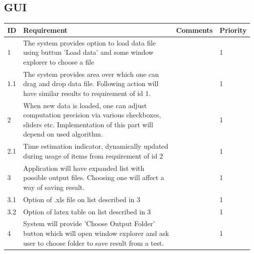\documentclass{article}
\begin{document}


\subsection{GUI} \label{GUI_func_req}

\begin{center}
\hspace*{-2.1cm}
	\begin{longtable}{| l | p{4cm} | p{3.5cm} | l |}
	
		\hline
	  	ID & Requirement & Comments & Priority \\
		\hline
		
		1 & 
		The system provides option to load data file using buttun 'Load data' and
		some window explorer to choose a file & 
		 &
		1 
		\\ \hline
		
		1.1 & 
		The system provides area over which one can drag and drop data file.
		Following action will have similar results to requirement of id 1. & 
		 &
		1 
		\\ \hline		
	
		2 & 
		When new data is loaded, one can adjust computation precision via various checkboxes, 			sliders etc. Implementation of this part will depend on used algorithm. & 
		 &
		1 
		\\ \hline		
	
			2.1 & 
		Time estimation indicator, dynamically updated during usage of items from requirement 			of id 2 & 
		 &
		1 
		\\ \hline		
		
		3 & 
		Application will have expanded list with possible output files. Choosing one will 				affect a way of saving result. & 
		 &
		1 
		\\ \hline			

		3.1 & 
		Option of .xls file on list described in 3 & 
		 &
		1 
		\\ \hline		

		3.2 & 
		Option of latex table on list described in 3 & 
		 &
		1 
		\\ \hline	

		4 & 
		System will provide 'Choose Output Folder' button which will open window explorer and 			ask user to choose folder to save result from a test. & 
		 &
		1 
		\\ \hline	
	

\end{longtable}
\end{center}
\end{document}
